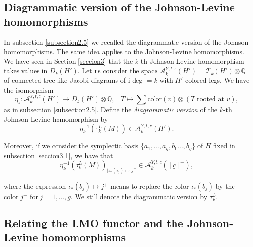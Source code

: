 \documentclass[10pt]{amsart}
\numberwithin{equation}{section}
\numberwithin{equation}{section}
\theoremstyle{definition}
\begin{document}
\subsection{Diagrammatic version of the Johnson-Levine homomorphisms}\label{subsection5.2}

In subsection \ref{subsection2.5} we recalled the diagrammatic version of the Johnson homomorphisms.  The same idea applies to the Johnson-Levine homomorphisms. We have seen in Section \ref{seccion3} that the $k$-th Johnson-Levine homomorphism takes values in $D_k(H')$. Let us consider the space $\mathcal{A}_k^{Y,t,c}(H')=\mathcal{T}_k(H')\otimes\mathbb{Q}$ of connected tree-like Jacobi diagrams of i-deg $=k$ with $H'$-colored legs. We have the isomorphism 
\begin{equation}\label{ecuacion4.15}%
\eta_k:\mathcal{A}_k^{Y,t,c}(H')\longrightarrow D_k(H')\otimes\mathbb{Q},\ \ \ \ T\longmapsto\sum \text{color}(v)\otimes (T \text{ rooted at } v),
\end{equation}
 as in subsection \ref{subsection2.5}. Define the \emph{diagrammatic version} of the $k$-th Johnson-Levine homomorphism by
$$\eta_k^{-1}(\tau_k^L(M))\in \mathcal{A}_k^{Y,t,c}(H').$$

\medskip

Moreover, if we consider the symplectic basis $\{a_1,\ldots,a_g,b_1\ldots,b_g\}$ of $H$ fixed in subsection \ref{seccion3.1}, we have that 
$$\eta_k^{-1}(\tau_k^L(M))_{|\iota_*(b_j)\mapsto j^+}\in \mathcal{A}_k^{Y,t,c}(\left\lfloor g\right\rceil^+),$$

\noindent where the expression $\iota_*(b_j)\mapsto j^+$ means to replace the color $\iota_*(b_j)$ by the color $j^+$ for $j=1,\ldots,g$.  We still denote the diagrammatic version by $\tau_k^L$.
\subsection{Relating the LMO functor and the Johnson-Levine homomorphisms}\label{subsection5.4}
 
\end{document}
